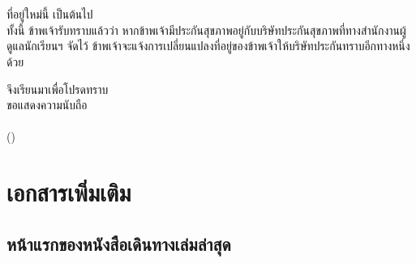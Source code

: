 \documentclass[a4paper,13pt]{article}
\begin{document}
\begin{itemize}[label={}]
  \indent\hspace{0.7in}\phantom{ที่อยู่ใหม่} \\
  \indent\hspace{0.7in}\phantom{ที่อยู่ใหม่} \\
  \indent\hspace{0.7in}ที่อยู่ใหม่นี้  เป็นต้นไป \\
  \indent\hspace{0.7in}ทั้งนี้ ข้าพเจ้ารับทราบแล้วว่า หากข้าพเจ้ามีประกันสุขภาพอยู่กับบริษัทประกันสุขภาพที่ทางสำนักงานผู้ดูแลนักเรียนฯ จัดไว้ ข้าพเจ้าจะแจ้งการเปลี่ยนแปลงที่อยู่ของข้าพเจ้าให้บริษัทประกันทราบอีกทางหนึ่งด้วย
\end{itemize}
จึงเรียนมาเพื่อโปรดทราบ \\

\noindent
\hspace{3.5in}ขอแสดงความนับถือ \\

\indent\hspace{2.6in} \\
\indent\hspace{2.9in}() \\


\newpage
\setcounter{page}{2}

\section{เอกสารเพิ่มเติม}
\subsection{หน้าแรกของหนังสือเดินทางเล่มล่าสุด}
% 
% 
\end{document}
